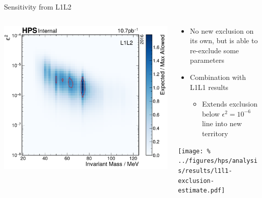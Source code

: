 \documentclass[aspectratio=169]{beamer}
\begin{document}

\begin{frame}{Sensitivity from L1L2}
  \begin{columns}
    \begin{column}{0.5\textwidth}
      \centering
      \includegraphics[width=\textwidth]{../figures/hps/analysis/results/exclusion-estimate.pdf}
    \end{column}
    \begin{column}{0.5\textwidth}
      \begin{itemize}
        \item No new exclusion on its own, but is able to re-exclude some parameters
        \item Combination with L1L1 results
          \begin{itemize}
            \item Extends exclusion below $\epsilon^2=10^{-6}$ line into new territory
          \end{itemize}
      \end{itemize}
      \begin{center}
        \texttt{[image: \%
          ../figures/hps/analysis/results/l1l1-exclusion-estimate.pdf]}
      \end{center}
    \end{column}
  \end{columns}
\end{frame}
\end{document}
